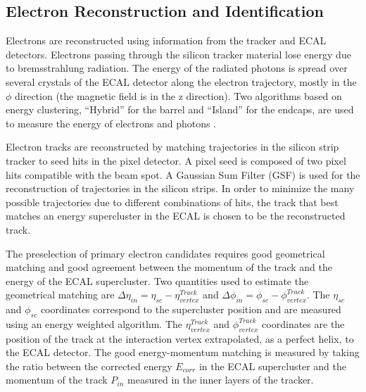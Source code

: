 \subsection{Electron Reconstruction and Identification}


\label{eID}

Electrons are reconstructed using information from the  tracker and ECAL detectors. Electrons
passing through the  silicon tracker material lose energy due to bremsstrahlung  radiation. The
energy of the radiated photons is spread  over several crystals of the ECAL detector along the 
electron trajectory, mostly in the $\phi$ direction  (the magnetic field is in the z direction).
Two algorithms  based on energy clustering, ``Hybrid'' for the barrel and  ``Island'' for the
endcaps, are used to measure the energy  of electrons and photons \cite{eRecoCMS}.

Electron tracks are reconstructed by matching trajectories  in the silicon strip tracker to seed
hits in the pixel  detector. A pixel seed is composed of two pixel hits  compatible with the beam
spot. A Gaussian Sum Filter (GSF)  is used for the reconstruction of trajectories in the  silicon
strips. In order to minimize the many possible  trajectories due to different combinations of hits,
the  track that best matches an energy supercluster in the ECAL  is chosen to be the reconstructed
track.

The preselection of primary electron candidates requires  good geometrical matching and good
agreement between the  momentum of the track and the energy of the ECAL  supercluster. Two
quantities used to estimate the geometrical matching are $\Delta \eta_{in} = \eta_{sc}
-\eta^{Track}_{vertex}$ and  $\Delta \phi_{in} = \phi_{sc} -\phi^{Track}_{vertex}$. The $\eta_{sc}$
and $\phi_{sc}$ coordinates correspond to  the supercluster position and are measured using an
energy weighted algorithm. The $\eta^{Track}_{vertex}$ and  $\phi^{Track}_{vertex}$ coordinates are
the position of the track at the interaction vertex extrapolated,  as a perfect helix, to the ECAL
detector. The good energy-momentum matching is measured by taking the ratio  between the corrected
energy $E_{corr}$ in the ECAL  supercluster and the momentum of the track $P_{in}$  measured in the
inner layers of the tracker.

